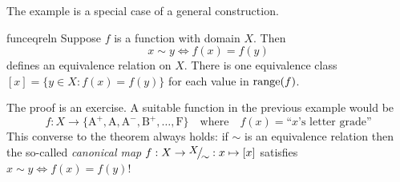 The example is a special case of a general construction.

\begin{thm}{}{funceqreln}
	Suppose $f$ is a function with domain $X$. Then 
	\[
		x\sim y\iff f(x)=f(y)
	\]
	defines an equivalence relation on $X$. There is one equivalence class $[x]=\{y\in X:f(x)=f(y)\}$ for each value in $\operatorname{range}(f)$.
\end{thm}

The proof is an exercise. A suitable function in the previous example would be
\[
	f:X\to \bigl\{\mathrm{A^+,A,A^-,B^+,\ldots,F}\bigr\}
	\quad \text{where} \quad 
	f(x) =\text{``$x$'s letter grade''}
\]
This converse to the theorem always holds: if $\sim$ is an equivalence relation then the so-called \emph{canonical map} $f:X\to \quotient X\sim:x\mapsto [x]$ satisfies $x\sim y\Longleftrightarrow f(x)=f(y)$!

\goodbreak


